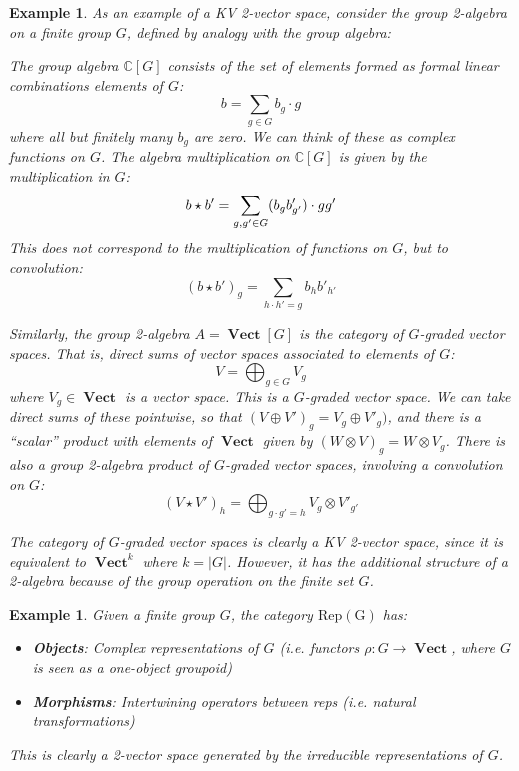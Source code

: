 \documentclass[10pt]{amsart}
\numberwithin{theorem}{subsection}
\newtheorem{varexample}[theorem]{Example}
\newenvironment{example}{\begin{varexample}\em}{\em\end{varexample}}
\newcommand{\ra}{\mathop{\rightarrow}}
\newcommand{\opname}[1]{\operatorname{#1}}
\newcommand{\catname}[1]{\boldsymbol{\opname{{#1}}}}
\newcommand{\V}{\catname{Vect}}
\newcommand{\CG}{\mathbb{C}[G]}
\newcommand{\VG}{\catname{Vect}[G]}
\begin{document}
\begin{example}\label{ex:grp2alg} As an example of a KV 2-vector space, consider the
\textit{group 2-algebra} on a finite group $G$, defined by analogy
with the group algebra:

The group algebra $\CG$ consists of the set of elements formed as
formal linear combinations elements of $G$:
\begin{equation}
b = \sum_{g \in G} b_g \cdot g
\end{equation}
where all but finitely many $b_g$ are zero.  We can think of these as
complex functions on $G$.  The algebra multiplication on $\CG$ is
given by the multiplication in $G$:
\begin{equation}
b \star b' = \sum_{g,g' \in G} (b_g b'_{g'}) \cdot g g' \\
\end{equation}
This does not correspond to the multiplication of functions on $G$,
but to \textit{convolution}:
\begin{equation}
(b \star b')_g = \sum_{h\cdot h' = g}b_h b'_{h'}
\end{equation}

Similarly, the \textit{group 2-algebra} $A=\VG$ is the
\textit{category} of $G$-graded vector spaces.  That is, direct
sums of vector spaces associated to elements of $G$:
\begin{equation}
V = \bigoplus_{g \in G} V_g
\end{equation}
where $V_g \in \V$ is a vector space.  This is a $G$-graded vector
space.  We can take direct sums of these pointwise, so that $(V
\oplus V')_g = V_g \oplus V'_g)$, and there is a ``scalar'' product
with elements of $\V$ given by $(W \otimes V)_g = W \otimes V_g$.
There is also a \textit{group 2-algebra} product of $G$-graded vector
spaces, involving a convolution on $G$:
\begin{equation}
(V \star V')_h = \bigoplus_{g \cdot g' = h}V_g \otimes V'_{g'}
\end{equation}

The category of $G$-graded vector spaces is clearly a KV 2-vector
space, since it is equivalent to $\V^k$ where $k = |G|$.  However, it
has the additional structure of a 2-algebra because of the group
operation on the finite set $G$.
\end{example}

\begin{example}
Given a finite group $G$, the category $\catname{Rep(G)}$ has:
\begin{itemize}
\item \textbf{Objects}: Complex representations of $G$ (i.e. functors $\rho : G \ra \V$, where $G$ is seen as a one-object groupoid)
\item \textbf{Morphisms}: Intertwining operators between reps (i.e. natural transformations)
\end{itemize}

This is clearly a 2-vector space generated by the irreducible representations of $G$.
\end{example}
\end{document}
